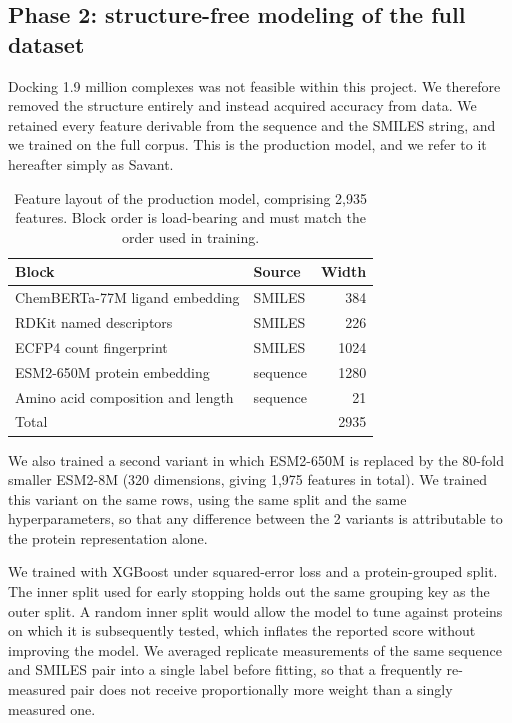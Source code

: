 \documentclass[11pt]{article}
\begin{document}
\subsection{Phase 2: structure-free modeling of the full dataset}
\label{sec:phase2}

Docking 1.9 million complexes was not feasible within this project. We
therefore removed the structure entirely and instead acquired accuracy from
data. We retained every feature derivable from the sequence and the SMILES
string, and we trained on the full corpus. This is the production model, and we
refer to it hereafter simply as Savant.

\begin{table}[H]
\centering
\caption{Feature layout of the production model, comprising 2,935 features.
Block order is load-bearing and must match the order used in training.}
\label{tab:blocks}
\begin{tabular}{llr}
\toprule
Block & Source & Width \\
\midrule
ChemBERTa-77M ligand embedding      & SMILES   & 384 \\
RDKit named descriptors             & SMILES   & 226 \\
ECFP4 count fingerprint             & SMILES   & 1024 \\
ESM2-650M protein embedding         & sequence & 1280 \\
Amino acid composition and length   & sequence & 21 \\
\midrule
\multicolumn{2}{l}{Total}                      & 2935 \\
\bottomrule
\end{tabular}
\end{table}

We also trained a second variant in which ESM2-650M is replaced by the 80-fold
smaller ESM2-8M (320 dimensions, giving 1,975 features in total). We trained
this variant on the same rows, using the same split and the same
hyperparameters, so that any difference between the 2 variants is attributable
to the protein representation alone.

We trained with XGBoost under squared-error loss and a protein-grouped split.
The inner split used for early stopping holds out the same grouping key as the
outer split. A random inner split would allow the model to tune against
proteins on which it is subsequently tested, which inflates the reported score
without improving the model. We averaged replicate measurements of the same
sequence and SMILES pair into a single label before fitting, so that a
frequently re-measured pair does not receive proportionally more weight than a
singly measured one.
\end{document}
